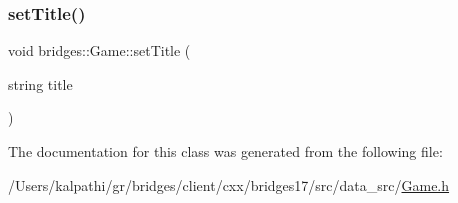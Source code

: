 \mbox{\label{classbridges_1_1_game_a6cfbd26183eb1202ea29b9f005dfb76b}} 
\subsubsection{\texorpdfstring{set\+Title()}{setTitle()}}
{\footnotesize\ttfamily void bridges\+::\+Game\+::set\+Title (\begin{DoxyParamCaption}\item[{string}]{title }\end{DoxyParamCaption})\hspace{0.3cm}{\ttfamily [inline]}}



The documentation for this class was generated from the following file\+:\begin{DoxyCompactItemize}
\item 
/\+Users/kalpathi/gr/bridges/client/cxx/bridges17/src/data\+\_\+src/\mbox{\hyperlink{_game_8h}{Game.\+h}}\end{DoxyCompactItemize}
